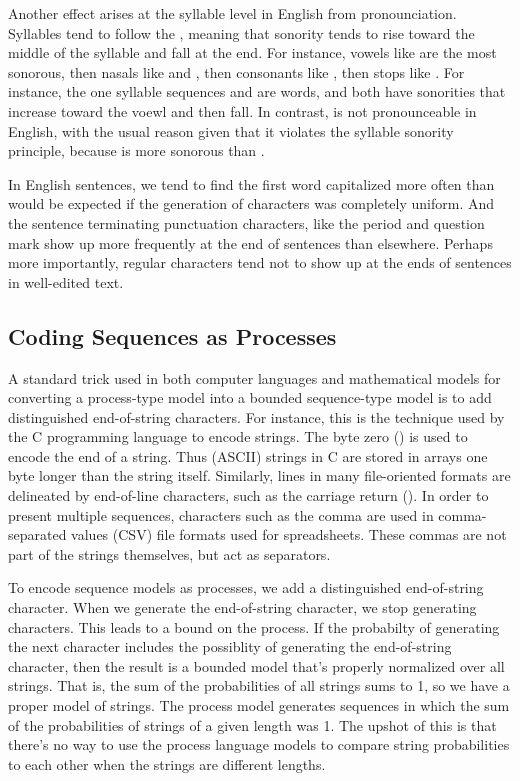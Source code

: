 Another effect arises at the syllable level in English from
pronounciation.  Syllables tend to follow the , meaning that sonority tends to rise toward the middle of
the syllable and fall at the end.  For instance, vowels like
 are the most sonorous, then nasals like
 and , then consonants like
, then stops like .  For instance, the
one syllable sequences  and 
are words, and both have sonorities that increase toward the voewl and
then fall.  In contrast,  is not pronounceable in
English, with the usual reason given that it violates the syllable
sonority principle, because  is more sonorous than
.

In English sentences, we tend to find the first word capitalized more
often than would be expected if the generation of characters was
completely uniform.  And the sentence terminating punctuation
characters, like the period and question mark show up more frequently
at the end of sentences than elsewhere.  Perhaps more importantly,
regular characters tend not to show up at the ends of sentences in
well-edited text.

\subsection{Coding Sequences as Processes}

A standard trick used in both computer languages and mathematical
models for converting a process-type model into a bounded
sequence-type model is to add distinguished end-of-string characters.
For instance, this is the technique used by the C programming language
to encode strings.  The byte zero () is used to encode the
end of a string.  Thus (ASCII) strings in C are stored in arrays one
byte longer than the string itself.  Similarly, lines in many
file-oriented formats are delineated by end-of-line characters, such
as the carriage return ().  In order to present multiple
sequences, characters such as the comma are used in comma-separated
values (CSV) file formats used for spreadsheets.  These commas are
not part of the strings themselves, but act as separators.

To encode sequence models as processes, we add a distinguished
end-of-string character.  When we generate the end-of-string
character, we stop generating characters.  This leads to a bound on
the process.  If the probabilty of generating the next character
includes the possiblity of generating the end-of-string character,
then the result is a bounded model that's properly normalized over all
strings.  That is, the sum of the probabilities of all strings sums to
1, so we have a proper model of strings.  The process model generates
sequences in which the sum of the probabilities of strings of a given
length was 1.  The upshot of this is that there's no way to use the
process language models to compare string probabilities to each other
when the strings are different lengths.

